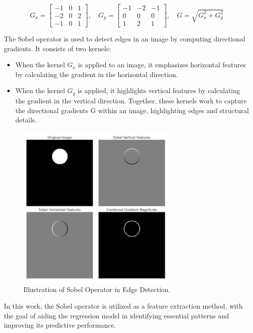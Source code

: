 \documentclass[twoside,11pt]{article}
\begin{document}
\[
G_x =
\begin{bmatrix}
-1 & 0 & 1 \\
-2 & 0 & 2 \\
-1 & 0 & 1
\end{bmatrix},
\quad
G_y =
\begin{bmatrix}
-1 & -2 & -1 \\
0 &  0 &  0 \\
1 &  2 &  1
\end{bmatrix},
\quad G =
\sqrt{G_x^2 + G_y^2}
\]

The Sobel operator is used to detect edges in an image by computing directional gradients. It consists of two kernels:
\begin{itemize}
\item When the kernel  $G_x$ is applied to an image, it emphasizes horizontal features by calculating the gradient in the horizontal direction.
\item When the kernel  $G_y$  is applied, it highlights vertical features by calculating the gradient in the vertical direction.
Together, these kernels work to capture the directional gradients G within an image, highlighting edges and structural details.
\end{itemize}

\begin{figure}[H]
\centering
\includegraphics[width=0.7\textwidth]{figure2.png}
\caption{Illustration of Sobel Operator in Edge Detection.}
\end{figure}

In this work, the Sobel operator is utilized as a feature extraction method, with the goal of aiding the regression model in identifying essential patterns and improving its predictive performance.
\end{document}
